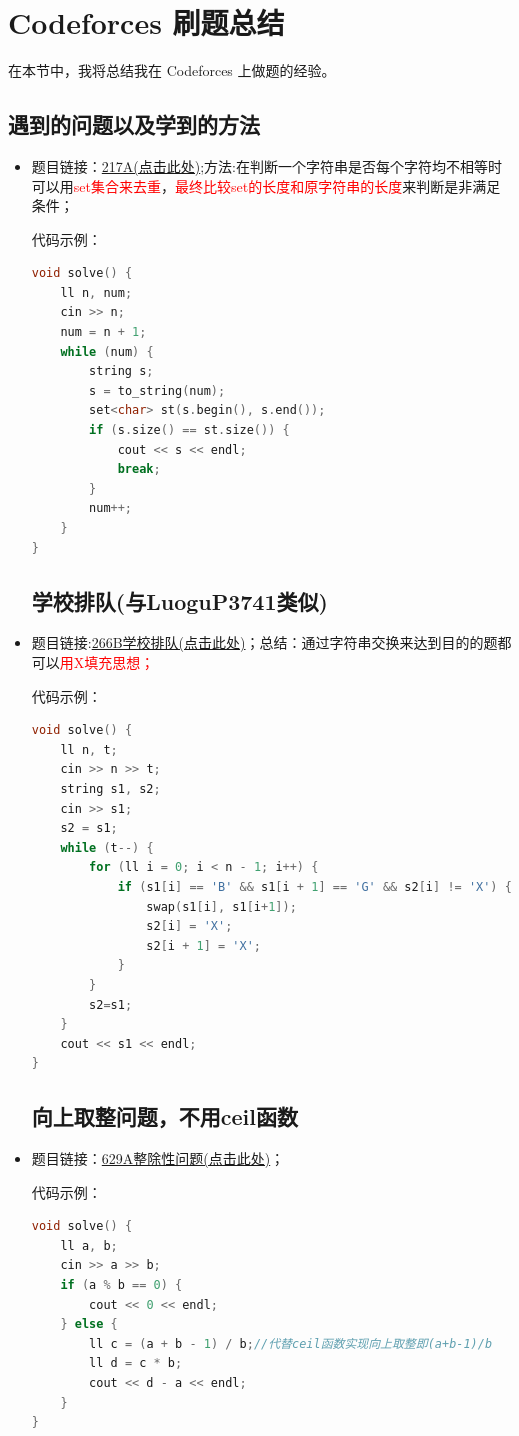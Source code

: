 \section{Codeforces 刷题总结}
在本节中，我将总结我在 Codeforces 上做题的经验。

\subsection{遇到的问题以及学到的方法}
\begin{itemize}
	\subsection{完美的一年}
	\item 题目链接：\href{https://codeforces.com/problemset/problem/271/A}{217A(点击此处)};方法:在判断一个字符串是否每个字符均不相等时可以用\textcolor{red}{set集合来去重}，\textcolor{red}{最终比较set的长度和原字符串的长度}来判断是非满足条件；
	
	代码示例：\\
\begin{lstlisting}[language=C++]
void solve() {
	ll n, num;
	cin >> n;
	num = n + 1;
	while (num) {
		string s;
		s = to_string(num);
		set<char> st(s.begin(), s.end());
		if (s.size() == st.size()) {
			cout << s << endl;
			break;
		}
		num++;
	}
}
\end{lstlisting}
\subsection{学校排队(与LuoguP3741类似)}
\item 题目链接:\href{https://codeforces.com/problemset/problem/266/B}{266B学校排队(点击此处)}；总结：通过字符串交换来达到目的的题都可以\textcolor{red}{用X填充思想；}
	
代码示例：\\
\begin{lstlisting}[language=C++]
void solve() {
	ll n, t;
	cin >> n >> t;
	string s1, s2;
	cin >> s1;
	s2 = s1;
	while (t--) {
		for (ll i = 0; i < n - 1; i++) {
			if (s1[i] == 'B' && s1[i + 1] == 'G' && s2[i] != 'X') {
				swap(s1[i], s1[i+1]);
				s2[i] = 'X';
				s2[i + 1] = 'X';
			}
		}
		s2=s1;
	}
	cout << s1 << endl;
}
\end{lstlisting}
\subsection{向上取整问题，不用ceil函数}
\item 题目链接：\href{https://codeforces.com/contest/1328/problem/A}{629A整除性问题(点击此处)}；

代码示例：\\
\begin{lstlisting}[language=C++]
void solve() {
	ll a, b;
	cin >> a >> b;
	if (a % b == 0) {
		cout << 0 << endl;
	} else {
		ll c = (a + b - 1) / b;//代替ceil函数实现向上取整即(a+b-1)/b
		ll d = c * b;
		cout << d - a << endl;
	}
}
\end{lstlisting}
\end{itemize}
